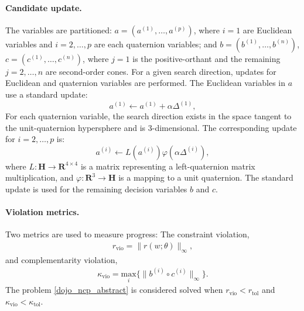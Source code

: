\paragraph{Candidate update.} 
The variables are partitioned: $a = (a^{(1)}, \dots, a^{(p)})$, where $i = 1$ are Euclidean variables and $i = 2, \dots, p$ are each quaternion variables; and $b = (b^{(1)}, \dots, b^{(n)})$, $c = (c^{(1)}, \dots, c^{(n)})$, where $j = 1$ is the positive-orthant and the remaining $j = 2, \dots, n$ are second-order cones.
For a given search direction, updates for Euclidean and quaternion variables are performed. The Euclidean variables in $a$ use a standard update: 
\begin{equation} 
	a^{(1)} \leftarrow a^{(1)} + \alpha \Delta^{(1)}, \label{dojo_standard_update}
\end{equation}
For each quaternion variable, the search direction exists in the space tangent to the unit-quaternion hypersphere and is 3-dimensional. The corresponding update for $i = 2, \dots, p$ is: 
\begin{equation}
	a^{(i)} \leftarrow L(a^{(i)}) \varphi(\alpha \Delta^{(i)}), \label{dojo_quaternion_update}
\end{equation}
where $L : \mathbf{H} \rightarrow \mathbf{R}^{4 \times 4}$ is a matrix representing a left-quaternion matrix multiplication, and $\varphi : \mathbf{R}^3 \rightarrow \mathbf{H}$ is a mapping to a unit quaternion. The standard update is used for the remaining decision variables $b$ and $c$.

\paragraph{Violation metrics.}
Two metrics are used to measure progress: 
The constraint violation, 
\begin{align}
	r_{\mbox{vio}} = \| r(w; \theta) \|_{\infty},
	\label{dojo_r_vio}
\end{align}
and complementarity violation,
\begin{align}
	\kappa_{\mbox{vio}} = \underset{i}{\mbox{max}} \{\| b^{(i)} \circ c^{(i)} \|_{\infty}\}.
	\label{dojo_kappa_vio}
\end{align}
The problem \eqref{dojo_ncp_abstract} is considered solved when $r_{\mbox{vio}} < r_{\mbox{tol}}$ and $\kappa_{\mbox{vio}} < \kappa_{\mbox{tol}}$.

